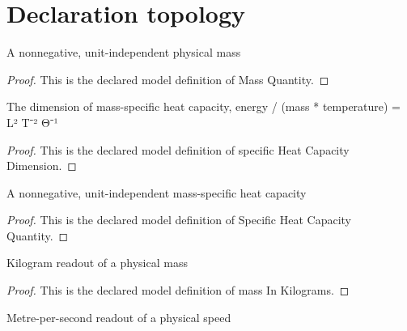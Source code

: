 \section{Declaration topology}
\begin{definition}
  \label{def:physics:phyx-mini-0490:phyxminiproblems-problemphyxmini0490-massquantity}
  A nonnegative, unit-independent physical mass
\end{definition}
\begin{proof}
  This is the declared model definition of Mass Quantity.
\end{proof}
\begin{definition}
  \label{def:physics:phyx-mini-0490:phyxminiproblems-problemphyxmini0490-specificheatcapacitydimension}
  The dimension of mass-specific heat capacity, energy / (mass * temperature) = L² T⁻² Θ⁻¹
\end{definition}
\begin{proof}
  This is the declared model definition of specific Heat Capacity Dimension.
\end{proof}
\begin{definition}
  \label{def:physics:phyx-mini-0490:phyxminiproblems-problemphyxmini0490-specificheatcapacityquantity}
  A nonnegative, unit-independent mass-specific heat capacity
\end{definition}
\begin{proof}
  This is the declared model definition of Specific Heat Capacity Quantity.
\end{proof}
\begin{definition}
  \label{def:physics:phyx-mini-0490:phyxminiproblems-problemphyxmini0490-massinkilograms}
  Kilogram readout of a physical mass
\end{definition}
\begin{proof}
  This is the declared model definition of mass In Kilograms.
\end{proof}
\begin{definition}
  \label{def:physics:phyx-mini-0490:phyxminiproblems-problemphyxmini0490-speedinmeterspersecond}
  Metre-per-second readout of a physical speed
\end{definition}
